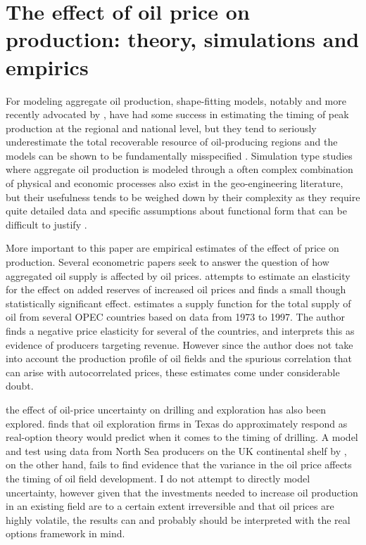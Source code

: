 \documentclass[12pt]{article}
\begin{document}
\FloatBarrier
\section{The effect of oil price on production: theory, simulations and empirics}

For modeling aggregate oil production, shape-fitting models, notably \citet{hubbert_energy_1962} and more recently advocated by \citet{deffeyes_hubberts_2001}, have had some success in estimating the timing of peak production at the regional and national level, but they tend to seriously underestimate the total recoverable resource of oil-producing regions and the models can be shown to be fundamentally misspecified \citep{boyce_prediction_2013}.   Simulation type studies where aggregate oil production is modeled through a often complex combination of physical and economic processes also exist in the geo-engineering literature, but their usefulness tends to be weighed down by their complexity as they require quite detailed data and specific assumptions about functional form that can be difficult to justify \citet{brandt_review_2010}.

More important to this paper are empirical estimates of the effect of price on production. Several econometric papers seek to answer the question of how aggregated oil supply is affected by oil prices.  \citet{farzin_impact_2001} attempts to estimate an elasticity for the effect on added reserves of increased oil prices and finds a small though statistically significant effect.  \citet{ramcharran_oil_2002} estimates a supply function for the total supply of oil from several OPEC countries based on data from 1973 to 1997.  The author finds a negative price elasticity for several of the countries, and interprets this as evidence of producers targeting revenue.  However since the author does not take into account the production profile of oil fields and the spurious correlation that can arise with autocorrelated prices, these estimates come under considerable doubt.  

the effect of oil-price uncertainty on drilling and exploration has also been explored.  \citet{kellogg_effect_2010} finds that oil exploration firms in Texas do approximately respond as real-option theory would predict when it comes to the timing of drilling.  A model and test using data from North Sea producers on the UK continental shelf by \citet{hurn_geology_1994}, on the other hand, fails to find evidence that the variance in the oil price affects the timing of oil field development.  I do not attempt to directly model uncertainty, however given that the investments needed to increase oil production in an existing field are to a certain extent irreversible and that oil prices are highly volatile, the results can and probably should be interpreted with the real options framework in mind.  
\end{document}
